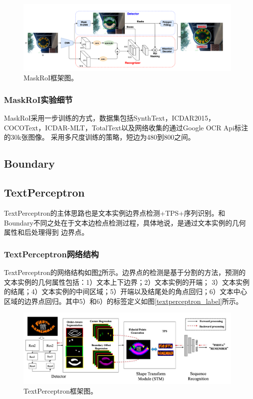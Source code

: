 \begin{figure}[htb]
    \centering
    \includegraphics[width=.98\textwidth]{figure/spotting/maskroi_framework.png} 
    \caption{MaskRoI框架图。} 
    \label{maskroi_framework} 
\end{figure}

\subsubsection{MaskRoI实验细节}
MaskRoI采用一步训练的方式，数据集包括SynthText，ICDAR2015，COCOText，ICDAR-MLT，TotalText以及网络收集的通过Google OCR Api标注的30k张图像。
采用多尺度训练的策略，短边为480到800之间。

\subsection{Boundary}

\subsection{TextPerceptron}
TextPerceptron的主体思路也是文本实例边界点检测+TPS+序列识别。和Boundary不同之处在于文本边检点检测过程，具体地说，是通过文本实例的几何属性和后处理得到
边界点。
\subsubsection{TextPerceptron网络结构}
TextPerceptron的网络结构如图\ref{textperceptron_framework}所示。边界点的检测是基于分割的方法，预测的文本实例的几何属性包括：1）文本上下边界；2）文本实例的开端；
3）文本实例的结尾；4）文本实例的中间区域；5）开端以及结尾处的角点回归；6）文本中心区域的边界点回归。其中5）和6）的标签定义如图\ref{textperceptron_label}所示。
\begin{figure}[htb]
    \centering
    \includegraphics[width=.98\textwidth]{figure/spotting/textperceptron_framework.png} 
    \caption{TextPerceptron框架图。} 
    \label{textperceptron_framework} 
\end{figure}


